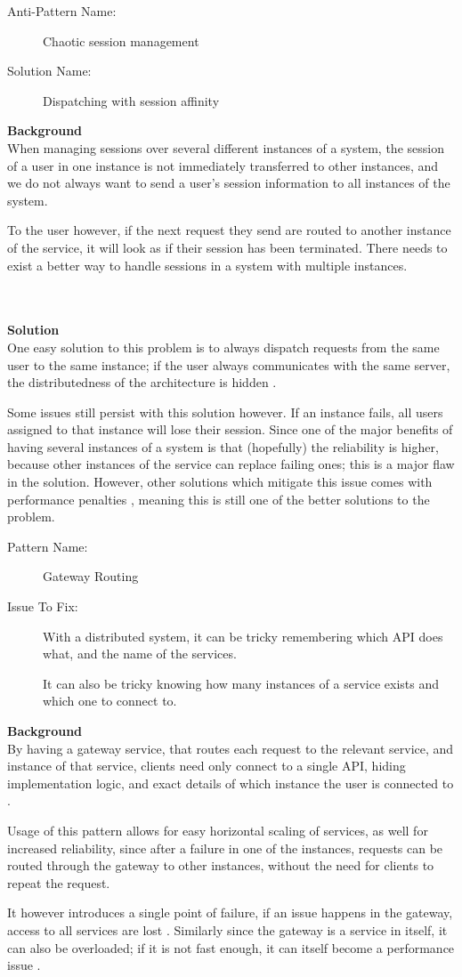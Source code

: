\documentclass[a4paper,UKenglish]{dagrep}
\newcommand{\pattern}[6]{
\begin{center}
  \begin{patt}
    \begin{description}
      \item[Pattern Name:]#1
      \ifthenelse{#2 = 0}{~}{\item[Also Known As:]#3}
      \item[Issue To Fix:]#5
    \end{description}
  \end{patt}
\end{center}
  \textbf{Background}\\#6

  }
\newcommand{\antipattern}[7]{
  \begin{center}
    \begin{apatt}
      \begin{description}
        \item[Anti-Pattern Name:]#1
        \ifthenelse{#2 = 0}{~}{\item[Also Known As:]#3}
        \item[Solution Name:]#5
      \end{description}
    \end{apatt}
  \end{center}
  \textbf{Background}\\#6
  ~\\\\
  \textbf{Solution}\\#7
  }
\begin{document}
\antipattern{Chaotic session management \cite{tate2002bitter}}{0}{}{}{
	Dispatching with session affinity}{When managing sessions over several different instances of a system, the session of a user in one instance is not immediately transferred to other instances, and we do not always want to send a user's session information to all instances of the system.

	To the user however, if the next request they send are routed to another instance of the service, it will look as if their session has been terminated. There needs to exist a better way to handle sessions in a system with multiple instances.
}{
	One easy solution to this problem is to always dispatch requests from the same user to the same instance; if the user always communicates with the same server, the distributedness of the architecture is hidden \cite{tate2002bitter}.

	Some issues still persist with this solution however. If an instance fails, all users assigned to that instance will lose their session. Since one of the major benefits of having several instances of a system is that  (hopefully) the reliability is higher, because other instances of the service can replace failing ones; this is a major flaw in the solution. However, other solutions which mitigate this issue comes with performance penalties \cite{tate2002bitter}, meaning this is still one of the better solutions to the problem.
}

\pattern{Gateway Routing \cite{microsoft2024performanceefficiency}}{0}{}{}{With a distributed system, it can be tricky remembering which API does what, and the name of the services.

	It can also be tricky knowing how many instances of a service exists and which one to connect to. }{
	By having a gateway service, that routes each request to the relevant service, and instance of that service, clients need only connect to a single API, hiding implementation logic, and exact details of which instance the user is connected to \cite{microsoft2024performanceefficiency}.

	Usage of this pattern allows for easy horizontal scaling of services, as well for increased reliability, since after a failure in one of the instances, requests can be routed through the gateway to other instances, without the need for clients to repeat the request.

	It however introduces a single point of failure, if an issue happens in the gateway, access to all services are lost \cite{microsoft2024performanceefficiency}. Similarly since the gateway is a service in itself, it can also be overloaded; if it is not fast enough, it can itself become a performance issue \cite{microsoft2024performanceefficiency}.
}
\end{document}
